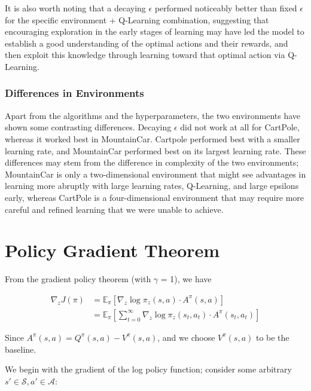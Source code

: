 \documentclass{article}
\begin{document}
It is also worth noting that a decaying $\epsilon$ performed noticeably better than fixed $\epsilon$
for the specific environment + Q-Learning combination, suggesting that encouraging exploration
in the early stages of learning may have led the model to establish a good understanding of the
optimal actions and their rewards, and then exploit this knowledge through learning toward that
optimal action via Q-Learning.




\subsubsection{Differences in Environments}
Apart from the algorithms and the hyperparameters, the two environments have shown some
contrasting differences. Decaying $\epsilon$ did not work at all for CartPole, whereas
it worked best in MountainCar. Cartpole performed best with a smaller learning rate, and
MountainCar performed best on its largest learning rate. These differences may stem from the
difference in complexity of the two environments; MountainCar is only a two-dimensional environment
that might see advantages in learning more abruptly with large learning rates, Q-Learning, and large epsilons early, whereas CartPole is a four-dimensional environment
that may require more careful and refined learning that we were unable to achieve.




\section{Policy Gradient Theorem}




From the gradient policy theorem (with $\gamma$ = 1), we have




\begin{align*}
\nabla_z J(\pi) &= \mathbb{E}_{\pi} \left [ \nabla_{z} \log \pi_{z}(s, a) \cdot A^{\pi}(s,a) \right]\\
        &= \mathbb{E}_{\pi} \left [\sum_{t=0}^\infty \nabla_{z} \log \pi_{z}(s_t, a_t) \cdot A^{\pi}(s_t,a_t) \right]
\end{align*}




Since $A^\pi(s,a) = Q^\pi(s,a) - V^\pi(s,a)$, and we choose $V^\pi(s,a)$ to be the baseline.




We begin with the gradient of the log policy function; consider some arbitrary $s' \in
\mathcal{S}, a' \in \mathcal{A}$:
\end{document}
